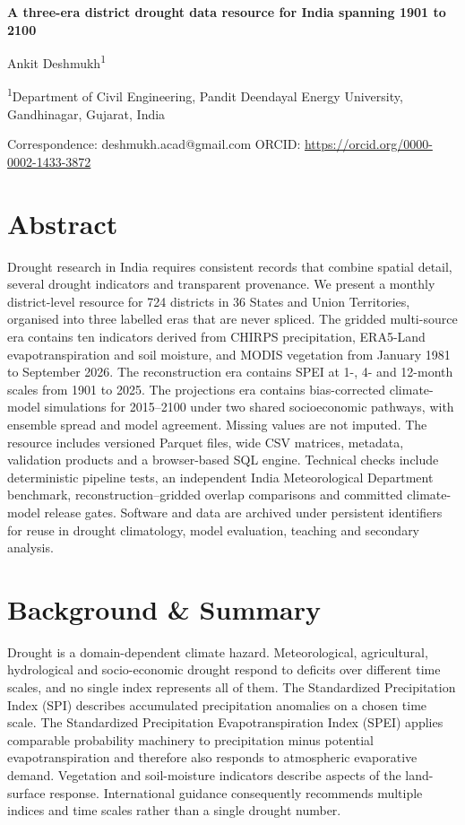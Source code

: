 \documentclass[11pt,a4paper]{article}
\begin{document}
{\LARGE\bfseries A three-era district drought data resource for India spanning 1901 to 2100\par}
\vspace{10pt}
{\large Ankit Deshmukh\textsuperscript{1}\par}
\vspace{4pt}
{\small\textsuperscript{1}Department of Civil Engineering, Pandit Deendayal Energy University, Gandhinagar, Gujarat, India\par}
\vspace{3pt}
{\small Correspondence: deshmukh.acad@gmail.com \quad ORCID: \url{https://orcid.org/0000-0002-1433-3872}\par}
\vspace{12pt}

\section*{Abstract}
Drought research in India requires consistent records that combine spatial detail, several drought indicators and transparent provenance. We present a monthly district-level resource for 724 districts in 36 States and Union Territories, organised into three labelled eras that are never spliced. The gridded multi-source era contains ten indicators derived from CHIRPS precipitation, ERA5-Land evapotranspiration and soil moisture, and MODIS vegetation from January 1981 to September 2026. The reconstruction era contains SPEI at 1-, 4- and 12-month scales from 1901 to 2025. The projections era contains bias-corrected climate-model simulations for 2015--2100 under two shared socioeconomic pathways, with ensemble spread and model agreement. Missing values are not imputed. The resource includes versioned Parquet files, wide CSV matrices, metadata, validation products and a browser-based SQL engine. Technical checks include deterministic pipeline tests, an independent India Meteorological Department benchmark, reconstruction--gridded overlap comparisons and committed climate-model release gates. Software and data are archived under persistent identifiers for reuse in drought climatology, model evaluation, teaching and secondary analysis.

\section*{Background \& Summary}
Drought is a domain-dependent climate hazard. Meteorological, agricultural, hydrological and socio-economic drought respond to deficits over different time scales, and no single index represents all of them\citep{WilhiteGlantz1985,MishraSingh2010}. The Standardized Precipitation Index (SPI) describes accumulated precipitation anomalies on a chosen time scale\citep{McKee1993}. The Standardized Precipitation Evapotranspiration Index (SPEI) applies comparable probability machinery to precipitation minus potential evapotranspiration and therefore also responds to atmospheric evaporative demand\citep{VicenteSerrano2010}. Vegetation and soil-moisture indicators describe aspects of the land-surface response\citep{Kogan1995}. International guidance consequently recommends multiple indices and time scales rather than a single drought number\citep{WMOLincoln2009}.
\end{document}
